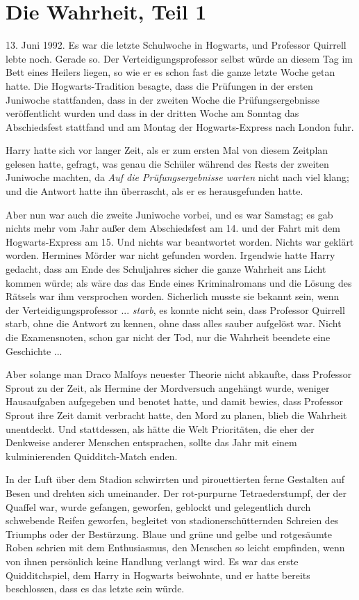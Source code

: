 \chapter{Die Wahrheit, Teil 1}

13. Juni 1992. Es war die letzte Schulwoche in Hogwarts, und Professor Quirrell
lebte noch. Gerade so. Der Verteidigungsprofessor selbst würde an diesem Tag im
Bett eines Heilers liegen, so wie er es schon fast die ganze letzte Woche getan
hatte. Die Hogwarts-Tradition besagte, dass die Prüfungen in der ersten
Juniwoche stattfanden, dass in der zweiten Woche die Prüfungsergebnisse
veröffentlicht wurden und dass in der dritten Woche am Sonntag das Abschiedsfest
stattfand und am Montag der Hogwarts-Express nach London fuhr.

Harry hatte sich vor langer Zeit, als er zum ersten Mal von diesem Zeitplan
gelesen hatte, gefragt, was genau die Schüler während des Rests der zweiten
Juniwoche machten, da \emph{\glqq{}Auf die Prüfungsergebnisse warten\grqq{}}
nicht nach viel klang; und die Antwort hatte ihn überrascht, als er es
herausgefunden hatte.

Aber nun war auch die zweite Juniwoche vorbei, und es war Samstag; es gab nichts
mehr vom Jahr außer dem Abschiedsfest am 14. und der Fahrt mit dem
Hogwarts-Express am 15. Und nichts war beantwortet worden. Nichts war geklärt
worden. Hermines Mörder war nicht gefunden worden. Irgendwie hatte Harry
gedacht, dass am Ende des Schuljahres sicher die ganze Wahrheit ans Licht kommen
würde; als wäre das das Ende eines Kriminalromans und die Lösung des Rätsels war
ihm versprochen worden. Sicherlich musste sie bekannt sein, wenn der
Verteidigungsprofessor ... \emph{starb}, es konnte nicht sein, dass Professor
Quirrell starb, ohne die Antwort zu kennen, ohne dass alles sauber aufgelöst
war. Nicht die Examensnoten, schon gar nicht der Tod, nur die Wahrheit beendete
eine Geschichte ...

Aber solange man Draco Malfoys neuester Theorie nicht abkaufte, dass Professor
Sprout zu der Zeit, als Hermine der Mordversuch angehängt wurde, weniger
Hausaufgaben aufgegeben und benotet hatte, und damit bewies, dass Professor
Sprout ihre Zeit damit verbracht hatte, den Mord zu planen, blieb die Wahrheit
unentdeckt. Und stattdessen, als hätte die Welt Prioritäten, die eher der
Denkweise anderer Menschen entsprachen, sollte das Jahr mit einem kulminierenden
Quidditch-Match enden.

In der Luft über dem Stadion schwirrten und pirouettierten ferne Gestalten auf
Besen und drehten sich umeinander. Der rot-purpurne Tetraederstumpf, der der
Quaffel war, wurde gefangen, geworfen, geblockt und gelegentlich durch
schwebende Reifen geworfen, begleitet von stadionerschütternden Schreien des
Triumphs oder der Bestürzung. Blaue und grüne und gelbe und rotgesäumte Roben
schrien mit dem Enthusiasmus, den Menschen so leicht empfinden, wenn von ihnen
persönlich keine Handlung verlangt wird. Es war das erste Quidditchspiel, dem
Harry in Hogwarts beiwohnte, und er hatte bereits beschlossen, dass es das
letzte sein würde.

